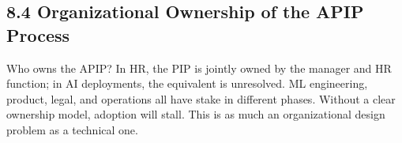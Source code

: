 \subsection{8.4  Organizational Ownership of the APIP Process}

Who owns the APIP? In HR, the PIP is jointly owned by the manager and HR function; in AI deployments, the equivalent is unresolved. ML engineering, product, legal, and operations all have stake in different phases. Without a clear ownership model, adoption will stall. This is as much an organizational design problem as a technical one.


